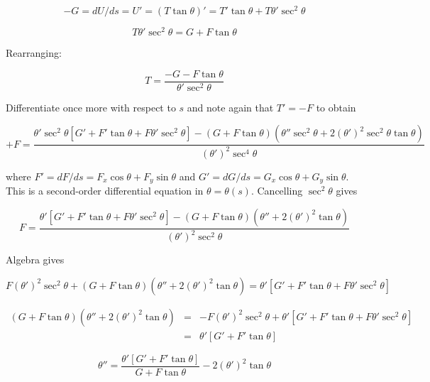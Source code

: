 \documentclass{article}
\begin{document}
\begin{equation}
  -G=dU/ds=U'=(T\tan\theta)'=T'\tan\theta + T\theta'\sec^2\theta
\end{equation}


\begin{equation}
  T\theta'\sec^2\theta=G+F\tan\theta
\end{equation}

Rearranging:

\begin{equation}
T=\frac{-G-F\tan\theta}{\theta'\sec^2\theta}
\end{equation}

Differentiate once more with respect to $s$ and note again that
$T'=-F$ to obtain

\begin{equation}
  +F=\frac
{    \theta'\sec^2\theta\left[G'+F'\tan\theta+F\theta'\sec^2\theta\right]-(G+F\tan\theta)(\theta''\sec^2\theta+2(\theta')^2\sec^2\theta\tan\theta)
  }{
    (\theta')^2\sec^4\theta
  }
\end{equation}

where $F'=dF/ds=F_x\cos\theta+F_y\sin\theta$ and
$G'=dG/ds=G_x\cos\theta+G_y\sin\theta$.  This is a second-order
differential equation in $\theta=\theta(s)$.
Cancelling $\sec^2\theta$  gives

\begin{equation}
  F=\frac{\theta'\left[G'+F'\tan\theta+F\theta'\sec^2\theta\right]-(G+F\tan\theta)(\theta''+2(\theta')^2\tan\theta)
  }{
    (\theta')^2\sec^2\theta
  }
\end{equation}


Algebra gives

\begin{equation}
  F(\theta')^2\sec^2\theta + (G+F\tan\theta)(\theta''+2(\theta')^2\tan\theta)
  =
\theta'\left[G'+F'\tan\theta+F\theta'\sec^2\theta\right]
\end{equation}

\begin{eqnarray}
  (G+F\tan\theta)(\theta''+2(\theta')^2\tan\theta)
  &=&
  -F(\theta')^2\sec^2\theta
  +
  \theta'\left[G'+F'\tan\theta+F\theta'\sec^2\theta\right]\\
  &=&    \theta'\left[G'+F'\tan\theta\right] 
\end{eqnarray}

\begin{equation}
  \theta''=
  \frac{
    \theta'\left[G'+F'\tan\theta\right]
  }{
    G+F\tan\theta
  }
  -2(\theta')^2\tan\theta
\end{equation}





\end{document}
